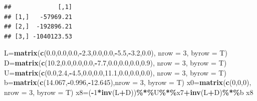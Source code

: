 \documentclass[
]{article}
\newenvironment{Shaded}{\begin{snugshade}}{\end{snugshade}}
\newcommand{\AttributeTok}[1]{\textcolor[rgb]{0.13,0.29,0.53}{#1}}
\newcommand{\DecValTok}[1]{\textcolor[rgb]{0.00,0.00,0.81}{#1}}
\newcommand{\FloatTok}[1]{\textcolor[rgb]{0.00,0.00,0.81}{#1}}
\newcommand{\FunctionTok}[1]{\textcolor[rgb]{0.13,0.29,0.53}{\textbf{#1}}}
\newcommand{\NormalTok}[1]{#1}
\newcommand{\OtherTok}[1]{\textcolor[rgb]{0.56,0.35,0.01}{#1}}
\newcommand{\SpecialCharTok}[1]{\textcolor[rgb]{0.81,0.36,0.00}{\textbf{#1}}}
\begin{document}
\begin{verbatim}
##             [,1]
## [1,]   -57969.21
## [2,]  -192896.21
## [3,] -1040123.53
\end{verbatim}

\begin{Shaded}
\begin{Highlighting}[]
\NormalTok{  L}\OtherTok{=}\FunctionTok{matrix}\NormalTok{(}\FunctionTok{c}\NormalTok{(}\FloatTok{0.0}\NormalTok{,}\FloatTok{0.0}\NormalTok{,}\FloatTok{0.0}\NormalTok{,}\SpecialCharTok{{-}}\FloatTok{2.3}\NormalTok{,}\FloatTok{0.0}\NormalTok{,}\FloatTok{0.0}\NormalTok{,}\SpecialCharTok{{-}}\FloatTok{5.5}\NormalTok{,}\SpecialCharTok{{-}}\FloatTok{3.2}\NormalTok{,}\FloatTok{0.0}\NormalTok{), }\AttributeTok{nrow =} \DecValTok{3}\NormalTok{, }\AttributeTok{byrow =}\NormalTok{ T)}
\NormalTok{  D}\OtherTok{=}\FunctionTok{matrix}\NormalTok{(}\FunctionTok{c}\NormalTok{(}\FloatTok{10.2}\NormalTok{,}\FloatTok{0.0}\NormalTok{,}\FloatTok{0.0}\NormalTok{,}\FloatTok{0.0}\NormalTok{,}\SpecialCharTok{{-}}\FloatTok{7.7}\NormalTok{,}\FloatTok{0.0}\NormalTok{,}\FloatTok{0.0}\NormalTok{,}\FloatTok{0.0}\NormalTok{,}\FloatTok{0.9}\NormalTok{), }\AttributeTok{nrow =} \DecValTok{3}\NormalTok{, }\AttributeTok{byrow =}\NormalTok{ T)}
\NormalTok{  U}\OtherTok{=}\FunctionTok{matrix}\NormalTok{(}\FunctionTok{c}\NormalTok{(}\FloatTok{0.0}\NormalTok{,}\FloatTok{2.4}\NormalTok{,}\SpecialCharTok{{-}}\FloatTok{4.5}\NormalTok{,}\FloatTok{0.0}\NormalTok{,}\FloatTok{0.0}\NormalTok{,}\FloatTok{11.1}\NormalTok{,}\FloatTok{0.0}\NormalTok{,}\FloatTok{0.0}\NormalTok{,}\FloatTok{0.0}\NormalTok{), }\AttributeTok{nrow =} \DecValTok{3}\NormalTok{, }\AttributeTok{byrow =}\NormalTok{ T)}
\NormalTok{  b}\OtherTok{=}\FunctionTok{matrix}\NormalTok{(}\FunctionTok{c}\NormalTok{(}\FloatTok{14.067}\NormalTok{,}\SpecialCharTok{{-}}\FloatTok{0.996}\NormalTok{,}\SpecialCharTok{{-}}\FloatTok{12.645}\NormalTok{),}\AttributeTok{nrow =} \DecValTok{3}\NormalTok{, }\AttributeTok{byrow =}\NormalTok{ T)}
\NormalTok{  x0}\OtherTok{=}\FunctionTok{matrix}\NormalTok{(}\FunctionTok{c}\NormalTok{(}\DecValTok{0}\NormalTok{,}\DecValTok{0}\NormalTok{,}\DecValTok{0}\NormalTok{), }\AttributeTok{nrow =} \DecValTok{3}\NormalTok{, }\AttributeTok{byrow =}\NormalTok{ T)}
\NormalTok{  x8}\OtherTok{=}\NormalTok{(}\SpecialCharTok{{-}}\DecValTok{1}\SpecialCharTok{*}\FunctionTok{inv}\NormalTok{(L}\SpecialCharTok{+}\NormalTok{D))}\SpecialCharTok{\%*\%}\NormalTok{U}\SpecialCharTok{\%*\%}\NormalTok{x7}\SpecialCharTok{+}\FunctionTok{inv}\NormalTok{(L}\SpecialCharTok{+}\NormalTok{D)}\SpecialCharTok{\%*\%}\NormalTok{b}
\NormalTok{  x8}
\end{Highlighting}
\end{Shaded}
\end{document}

